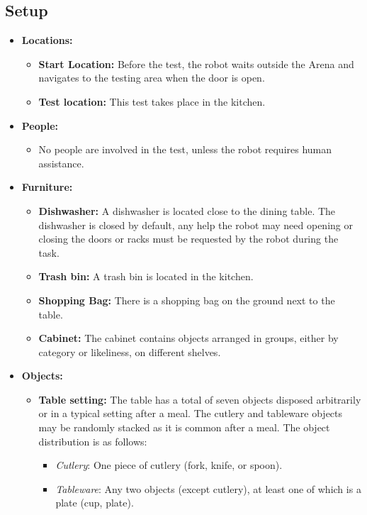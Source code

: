 \subsection*{Setup}
\begin{itemize}[nosep]
	\item \textbf{Locations:}
		\begin{itemize}
			\item \textbf{Start Location:} Before the test, the robot waits outside the Arena and navigates to the testing area when the door is open.
			\item \textbf{Test location:} This test takes place in the kitchen.
		\end{itemize}
	\item \textbf{People:}
		\begin{itemize}
			\item No people are involved in the test, unless the robot requires human assistance.
		\end{itemize}
	\item \textbf{Furniture:}
		\begin{itemize}
			\item \textbf{Dishwasher:} A dishwasher is located close to the dining table. The dishwasher is closed by default, any help the robot may need opening or closing the doors or racks must be requested by the robot during the task.
			\item \textbf{Trash bin:} A trash bin is located in the kitchen.
			\item \textbf{Shopping Bag:} There is a shopping bag on the ground next to the table.
			\item \textbf{Cabinet:} The cabinet contains objects arranged in groups, either by category or likeliness, on different shelves.
		\end{itemize}
	\item \textbf{Objects:}
		\begin{itemize}
			\item \textbf{Table setting:} The table has a total of seven objects disposed arbitrarily or in a typical setting after a meal. The cutlery and tableware objects may be randomly stacked as it is common after a meal. 
			The object distribution is as follows:
			\begin{itemize}[nosep]
				\item\textit{Cutlery}: One piece of cutlery (fork, knife, or spoon).
				\item\textit{Tableware}: Any two objects (except cutlery), at least one of which is a plate (cup, plate).

\end{itemize}
\end{itemize}
\end{itemize}
